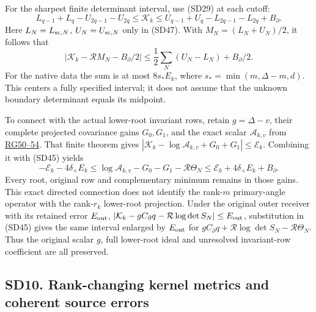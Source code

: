 \documentclass[11pt]{article}
\begin{document}
For the sharpest finite determinant interval, use (SD29) at each cutoff: \[
L_{q-1}+L_q-U_{2q-1}-U_{2q}
\le\mathcal K_k
\le U_{q-1}+U_q-L_{2q-1}-L_{2q}+B_\partial.
\tag{SD47}
\] Here \(L_N=L_{{\rm sc},N}\), \(U_N=U_{{\rm sc},N}\) only in (SD47). With \(M_N=(L_N+U_N)/2\), it follows that \[
\left|\mathcal K_k-\mathcal RM_N-B_\partial/2\right|
\le\frac12\sum_N(U_N-L_N)+B_\partial/2.
\tag{SD48}
\] For the native data the sum is at most \(8s_*E_k\), where \(s_*=\min(m,\Delta-m,d)\). This centers a fully specified interval; it does not assume that the unknown boundary determinant equals its midpoint.

To connect with the actual lower-root invariant rows, retain \(g=\Delta-v\), their complete projected covariance gains \(G_0,G_1\), and the exact scalar \(\mathcal A_{k,v}\) from \href{https://github.com/KokunoYumeto/zeta-function-research-reader/blob/13ca9b136fcdae48df7454bd9bf99e1ef22dd03c/workbenches/splitzero-tandem/continuations/20260922-original-growth-resolvent/GROWTH_PROOFS.md}{RG50--54}. That finite theorem gives \(|\mathcal K_k-\log\mathcal A_{k,v}+G_0+G_1|\le\mathcal E_k\). Combining it with (SD45) yields \[
-\mathcal E_k-4\delta_+E_k
\le \log\mathcal A_{k,v}-G_0-G_1-\mathcal R\Theta_N
\le \mathcal E_k+4\delta_+E_k+B_\partial.
\tag{SD49}
\] Every root, original row and complementary minimum remains in those gains. This exact directed connection does not identify the rank-\(m\) primary-angle operator with the rank-\(r_k\) lower-root projection. Under the original outer receiver with its retained error \(E_{\rm out}\), \(|\mathcal K_k-gC_\partial q-\mathcal R\log\det S_N|\le E_{\rm out}\), substitution in (SD45) gives the same interval enlarged by \(E_{\rm out}\) for \(gC_\partial q+\mathcal R\log\det S_N-\mathcal R\Theta_N\). Thus the original scalar \(g\), full lower-root ideal and unresolved invariant-row coefficient are all preserved.

\subsection{SD10. Rank-changing kernel metrics and coherent source errors}\label{sd10.-rank-changing-kernel-metrics-and-coherent-source-errors}
\end{document}
